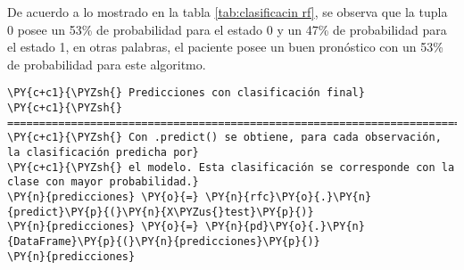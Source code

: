 \begin{table}[H]
\centering
\setlength{\tabcolsep}{5pt}
\caption{Predicciones probabilísticas para cada observación Random Forest}
\label{tab:clasificacin rf}
\end{table}
        
    De acuerdo a lo mostrado en la tabla \ref{tab:clasificacin rf}, se observa que la tupla 0 posee un 53\% de probabilidad para el estado 0 y un 47\% de probabilidad para el estado 1, en otras palabras, el paciente posee un buen pronóstico con un 53\% de probabilidad para este algoritmo.

    \begin{tcolorbox}[breakable, size=fbox, boxrule=1pt, pad at break*=1mm,colback=cellbackground, colframe=cellborder]
\begin{Verbatim}[commandchars=\\\{\}]
\PY{c+c1}{\PYZsh{} Predicciones con clasificación final}
\PY{c+c1}{\PYZsh{} ==============================================================================}
\PY{c+c1}{\PYZsh{} Con .predict() se obtiene, para cada observación, la clasificación predicha por}
\PY{c+c1}{\PYZsh{} el modelo. Esta clasificación se corresponde con la clase con mayor probabilidad.}
\PY{n}{predicciones} \PY{o}{=} \PY{n}{rfc}\PY{o}{.}\PY{n}{predict}\PY{p}{(}\PY{n}{X\PYZus{}test}\PY{p}{)}
\PY{n}{predicciones} \PY{o}{=} \PY{n}{pd}\PY{o}{.}\PY{n}{DataFrame}\PY{p}{(}\PY{n}{predicciones}\PY{p}{)}
\PY{n}{predicciones}
\end{Verbatim}
\end{tcolorbox}

